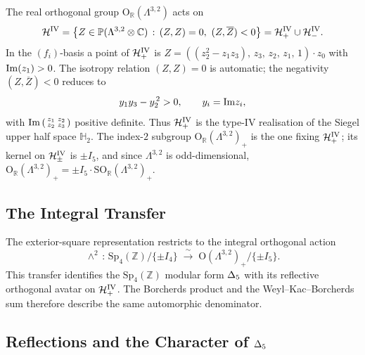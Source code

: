 The real orthogonal group $\mathrm{O}_{\mathbb{R}}(\Lambda^{3,2})$
acts on
\[
\mathcal{H}^{\mathrm{IV}} = \bigl\{Z\in\mathbb{P}(\Lambda^{3,2}\otimes\mathbb{C})
\,:\, (Z,Z)=0,\ (Z,\overline{Z})<0\bigr\}
= \mathcal{H}^{\mathrm{IV}}_{+}\cup\mathcal{H}^{\mathrm{IV}}_{-}.
\]
In the $(f_i)$-basis a point of $\mathcal{H}^{\mathrm{IV}}_{+}$ is
$Z = ((z_2^2 - z_1 z_3),\, z_3,\, z_2,\, z_1,\, 1)\cdot z_0$ with
$\mathrm{Im}(z_1)>0$. The isotropy relation $(Z,Z)=0$ is automatic; the
negativity $(Z,\overline{Z})<0$ reduces to
\[
y_1 y_3 - y_2^{\,2} > 0, \qquad y_i = \mathrm{Im} z_i,
\]
with $\mathrm{Im}\left(\begin{smallmatrix}z_1&z_2\\z_2&z_3\end{smallmatrix}\right)$
positive definite. Thus $\mathcal{H}^{\mathrm{IV}}_{+}$ is the type-IV
realisation of the Siegel upper half space $\mathbb{H}_2$.
The index-$2$ subgroup $\mathrm{O}_{\mathbb{R}}(\Lambda^{3,2})_+$ is the
one fixing $\mathcal{H}^{\mathrm{IV}}_+$; its kernel on $\mathcal{H}^{\mathrm{IV}}_\pm$
is $\pm I_5$, and since $\Lambda^{3,2}$ is odd-dimensional,
$\mathrm{O}_{\mathbb{R}}(\Lambda^{3,2})_+ = \pm I_5\cdot
\mathrm{SO}_{\mathbb{R}}(\Lambda^{3,2})_+$.

\subsection*{The Integral Transfer}

The exterior-square representation restricts to the integral
orthogonal action
\[
\wedge^2\,:\, \mathrm{Sp}_4(\mathbb{Z})/\{\pm I_4\}
\;\xrightarrow{\ \sim\ }\;
\mathrm{O}(\Lambda^{3,2})_+/\{\pm I_5\}.
\]
This transfer identifies the $\mathrm{Sp}_4(\mathbb{Z})$ modular form
\(\Delta{}_{5}\) with its reflective orthogonal avatar on
$\mathcal{H}^{\mathrm{IV}}_+$. The Borcherds product and the
Weyl--Kac--Borcherds sum therefore describe the same automorphic
denominator.

\subsection*{Reflections and the Character of $\Delta{}_{5}$}


